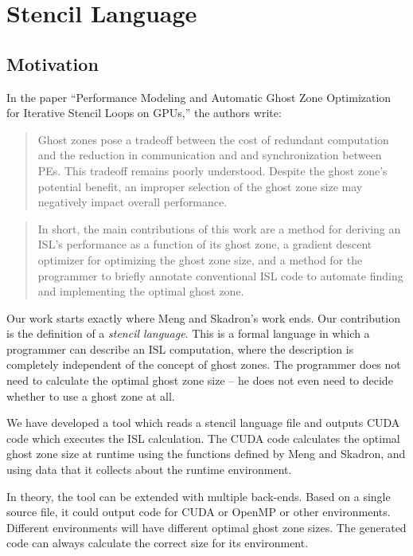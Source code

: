 \documentclass[11pt]{article}
\begin{document}
\section{Stencil Language}

\subsection{Motivation}

In the paper ``Performance Modeling and Automatic Ghost Zone
Optimization for Iterative Stencil Loops on GPUs,'' the authors write:
\begin{quote}
Ghost zones pose a tradeoff between the cost of redundant computation
and the reduction in communication and and synchronization between
PEs.  This tradeoff remains poorly understood.  Despite the ghost
zone's potential benefit, an improper selection of the ghost zone size
may negatively impact overall performance.
\end{quote}
\begin{quote}
In short, the main contributions of this work are a method for
deriving an ISL's performance as a function of its ghost zone, a
gradient descent optimizer for optimizing the ghost zone size, and a
method for the programmer to briefly annotate conventional ISL code to
automate finding and implementing the optimal ghost zone.
\end{quote}

Our work starts exactly where Meng and Skadron's work ends.  Our
contribution is the definition of a {\em stencil language}.  This is a
formal language in which a programmer can describe an ISL computation,
where the description is completely independent of the concept of
ghost zones.  The programmer does not need to calculate the optimal
ghost zone size -- he does not even need to decide whether to use a
ghost zone at all.

We have developed a tool which reads a stencil language file and
outputs CUDA code which executes the ISL calculation.  The CUDA code
calculates the optimal ghost zone size at runtime using the functions
defined by Meng and Skadron, and using data that it collects about the
runtime environment.

In theory, the tool can be extended with multiple back-ends.  Based on
a single source file, it could output code for CUDA or OpenMP or other
environments.  Different environments will have different optimal
ghost zone sizes.  The generated code can always calculate the correct
size for its environment.
\end{document}
